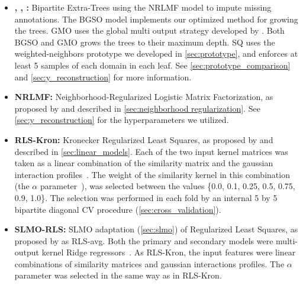 \begin{itemize}
    \item \textbf{, , :} Bipartite Extra-Trees using the NRLMF model to impute missing annotations. The BGSO model implements our optimized method for growing the trees. GMO uses the global multi output strategy developed by . Both BGSO and GMO grows the trees to their maximum depth. SQ uses the weighted-neighbors prototype we developed in \autoref{sec:prototype}, and enforces at least 5 samples of each domain in each leaf. See \autoref{sec:prototype_comparison} and \autoref{sec:y_reconstruction} for more information.

    \item \textbf{NRLMF:} Neighborhood-Regularized Logistic Matrix Factorization, as proposed by  and described in \autoref{sec:neighborhood regularization}. See \autoref{sec:y_reconstruction} for the hyperparameters we utilized.

    \item \textbf{RLS-Kron:} Kronecker Regularized Least Squares, as proposed by  and described in \autoref{sec:linear_models}.
    Each of the two input kernel matrices was taken as a linear combination of the similarity matrix and the gaussian interaction profiles~\cite{vanlaarhoven2011gaussian}. %
    The weight of the similarity kernel in this combination (the $\alpha$ parameter~\cite{vanlaarhoven2011gaussian}), was selected between the values \{0.0, 0.1, 0.25, 0.5, 0.75, 0.9, 1.0\}.
    The selection was performed in each fold by an internal 5 by 5 bipartite diagonal CV procedure (\autoref{sec:cross_validation}).

    \item \textbf{SLMO-RLS:} SLMO adaptation (\autoref{sec:slmo}) of Regularized Least Squares, as proposed by  as RLS-avg. Both the primary and secondary models were multi-output kernel Ridge regressors~\cite[p.~492-493]{murphy2012machine}. 
    As RLS-Kron, the input features were linear combinations of similarity matrices and gaussian interactions profiles. The $\alpha$ parameter was selected in the same way as in RLS-Kron.


\end{itemize}
